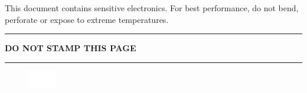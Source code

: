 \newpage
{}
\newgeometry{}
\begin{center}
\color{Blue}
This document contains sensitive electronics. For best performance, do not bend, perforate or expose to extreme temperatures.\\
\vspace{0.5in}
\hrule
\vspace{0.1in}
\bf DO NOT STAMP THIS PAGE
\vspace{0.1in}
\hrule
\vspace{0.5in}
\begin{figure}[h]
    \centering
    \includegraphics[width=0.5in,decodearray={0 0 1 0 1 0.4 0 0}]{images/epassport.png}
\end{figure}
\end{center}
\restoregeometry